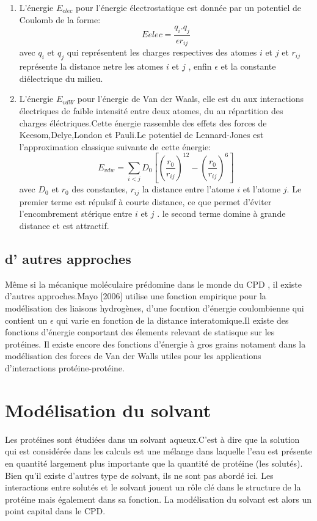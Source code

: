 \begin{enumerate}
  \label{VdW}
\item L'énergie $E_{elec}$ pour l'énergie électrostatique est donnée par un potentiel de Coulomb de la forme:
  \begin{equation}
    E{elec}=\frac{q_i.q_j}{\epsilon r_{ij}}
  \end{equation}
  avec $q_i$ et $q_j$ qui représentent les charges respectives des atomes $i$ et $j$ et $r_{ij}$ représente la distance netre les atomes $i$ et $j$ , enfin $\epsilon$ et la constante diélectrique du milieu.
\item L'énergie  $E_{vdW}$ pour l'énergie de Van der Waals, elle est du aux interactions électriques de faible intensité entre deux atomes, du au répartition des charges éléctriques.Cette énergie rassemble des effets des forces de Keesom,Delye,London et Pauli.Le potentiel de Lennard-Jones est l'approximation classique suivante de cette énergie:
  \begin{equation}
  E_{vdw} = \sum_{i<j}D_0 [(\frac{r_0}{r_{ij}})^12 - (\frac{r_0}{r_{ij}})^6]  
  \end{equation}
avec $D_0$ et $r_0$ des constantes, $r_{ij}$ la distance entre l'atome $i$ et l'atome $j$. Le premier terme est répulsif à courte distance, ce que permet d'éviter l'encombrement stérique entre $i$ et $j$ . le second terme domine à grande distance et est attractif. 
  
\end{enumerate}


\subsection{d' autres approches}

Même si la mécanique moléculaire prédomine dans le monde du CPD , il existe d'autres approches.Mayo [2006] utilise une fonction empirique pour la modélisation des liaisons hydrogènes, d'une focntion d'énergie coulombienne qui contient un $\epsilon$ qui varie en fonction de la distance interatomique.Il existe des fonctions d'énergie  conportant des élements relevant de statisque sur les protéines. Il existe encore des fonctions d'énergie à gros grains notament dans la modélisation des forces de Van der Walls utiles pour les applications d'interactions protéine-protéine.

\section{Modélisation du solvant}
Les protéines sont étudiées dans un solvant aqueux.C'est à dire que la solution qui est considérée dans les calculs est une mélange dans laquelle l'eau est présente en quantité largement plus importante que la quantité de protéine (les solutés). Bien qu'il existe d'autres type de solvant, ils ne sont pas abordé ici. Les interactions entre solutés et le solvant jouent un rôle clé dans le structure de la protéine mais également dans sa fonction. La modélisation du solvant est alors un point capital dans le CPD.

